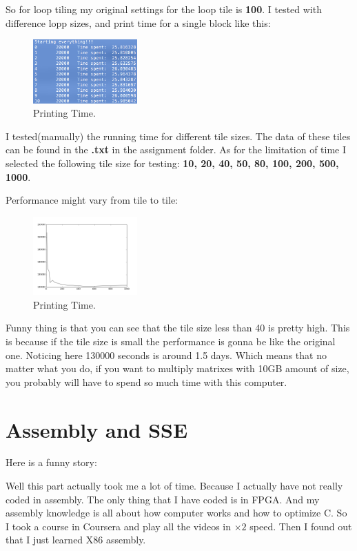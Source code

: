 \documentclass[11pt]{article}
\begin{document}
So for loop tiling my original settings for the loop tile is \textbf{100}. I tested with difference lopp sizes, and print time for a single block like this:
\begin{figure}[htb]
\centering
\includegraphics[width=4cm]{./tileexample.png}
\caption{\label{fig:orgparagraph2}
Printing Time.}
\end{figure}

I tested(manually) the running time for different tile sizes. The data of these tiles can be found in the \textbf{.txt} in the assignment folder. As for the limitation of
time I selected the following tile size for testing: \textbf{10, 20, 40, 50, 80, 100, 200, 500, 1000}. 

Performance might vary from tile to tile:

\begin{figure}[htb]
\centering
\includegraphics[width=4cm]{./figure.png}
\caption{\label{fig:orgparagraph3}
Printing Time.}
\end{figure}


Funny thing is that you can see that the tile size less than 40 is pretty high. This is because if the tile size is small the performance 
is gonna be like the original one. Noticing here 130000 seconds is around 1.5 days. Which means that no matter what you do, if you want to multiply 
matrixes with 10GB  amount of size, you probably will have to spend so much time with this computer.

\section{Assembly and SSE}
\label{sec:orgheadline7}

Here is a funny story:

Well this part actually took me a lot of time. Because I actually have not really coded in assembly. The only thing that I have coded is in FPGA. And 
my assembly knowledge is all about how computer works and how to optimize C. So I took a course in Coursera and play all the videos in \(\times 2\) speed. 
Then I found out that I just learned X86 assembly. 
\end{document}
